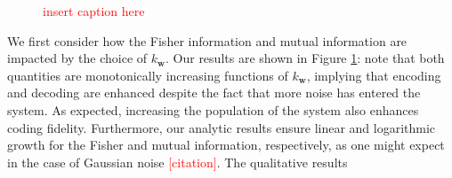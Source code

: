 \documentclass[11pt]{article}
\begin{document}
	\begin{figure}[b!]
		\label{fig:struct-linear}
		\centering
		\caption{\textcolor{red}{insert caption here}}
	\end{figure}
	
	We first consider how the Fisher information and mutual information are impacted by the choice of $k_{\mathbf{w}}$. Our results are shown in Figure \ref{fig:struct-linear}: note that both quantities are monotonically increasing functions of $k_{\mathbf{w}}$, implying that encoding and decoding are enhanced despite the fact that more noise has entered the system. As expected, increasing the population of the system also enhances coding fidelity. Furthermore, our analytic results ensure linear and logarithmic growth for the Fisher and mutual information, respectively, as one might expect in the case of Gaussian noise \textcolor{red}{[citation]}. The qualitative results 
	
\end{document}
